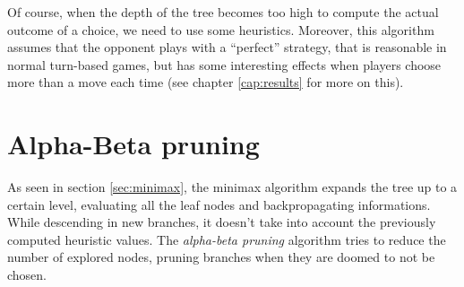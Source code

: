 Of course, when the depth of the tree becomes too high to compute the actual outcome of a choice, we need to use some heuristics. Moreover, this algorithm assumes that the opponent plays with a ``perfect'' strategy, that is reasonable in normal turn-based games, but has some interesting effects when players choose more than a move each time (see chapter \ref{cap:results} for more on this).

\section{Alpha-Beta pruning}
As seen in section \ref{sec:minimax}, the minimax algorithm expands the tree up to a certain level, evaluating all the leaf nodes and backpropagating informations.
While descending in new branches, it doesn't take into account the previously computed heuristic values.
The \textit{alpha-beta pruning} algorithm tries to reduce the number of explored nodes, pruning branches when they are doomed to not be chosen.

